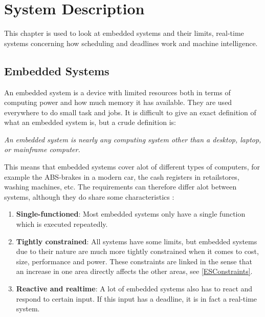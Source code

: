\chapter{System Description} 
This chapter is used to look at embedded systems and their limits,
real-time systems concerning how scheduling and deadlines work and machine
intelligence.

\section{Embedded Systems}
An embedded system is a device with limited resources both in terms of computing
power and how much memory it has available. They are used everywhere to do small task and
jobs. It is difficult to give an exact definition of what an embedded system is,
but a crude definition\citep[ch.1.1]{vahid1999embedded} is:\nl

\textit{An  embedded  system  is  nearly  any computing system other than a desktop,
laptop, or  mainframe  computer.}\nl

This means that embedded systems cover alot of different types of computers, for example
the ABS-brakes in a modern car, the cash registers in retailstores, washing machines, etc.
The requirements can therefore differ alot between systems, although they do
share some characteristics \Source:

\begin{enumerate}
  \item \textbf{Single-functioned}:  Most embedded systems only have a single
  function which is executed repeatedly.
  \item \textbf{Tightly constrained}: All systems have some limits, but embedded
  systems due to their nature are much more tightly constrained when it comes to
  cost, size, performance and power. These constraints are linked in the sense
  that an increase in one area directly affects the other areas, see
  \autoref{ESConstraints}.
  \item \textbf{Reactive and realtime}: A lot of embedded systems also has to
  react and respond to certain input. If this input has a deadline, it is in
  fact a real-time system.
\end{enumerate}
	





